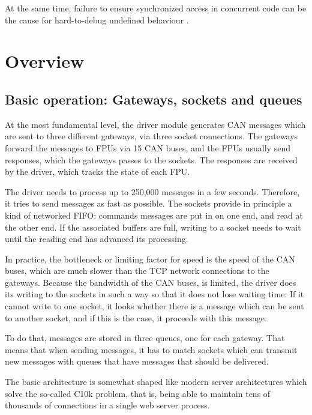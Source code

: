 \documentclass[fontsize=12,a4paper]{scrartcl}
\begin{document}
At the same time, failure to ensure synchronized access in concurrent
code can be the cause for hard-to-debug undefined behaviour
\cite{Regehr:AGtUBPt3}\cite{MeyersAlexandrescu:2004:DCL}\cite[p
  218-225]{Love:2013:LSP}.

\section{Overview}

\subsection{Basic operation: Gateways, sockets and queues}

At the most fundamental level, the driver module generates CAN
messages which are sent to three different gateways, via three socket
connections\cite[chapters 56-61]{Kerrisk:TLPI}. The gateways forward
the messages to FPUs via 15 CAN buses, and the FPUs usually send
responses, which the gateways passes to the sockets. The responses are
received by the driver, which tracks the state of each FPU.

The driver needs to process up to 250,000 messages in a few seconds.
Therefore, it tries to send messages as fast as possible. The sockets
provide in principle a kind of networked FIFO: commands messages are
put in on one end, and read at the other end. If the associated
buffers are full, writing to a socket needs to wait until the reading
end has advanced its processing.

In practice, the bottleneck or limiting factor for speed is the speed
of the CAN buses, which are much slower than the TCP network
connections to the gateways. Because the bandwidth of the CAN buses,
is limited, the driver does its writing to the sockets in such a way
so that it does not lose waiting time: If it cannot write to one
socket, it looks whether there is a message which can be sent to
another socket, and if this is the case, it proceeds with this
message.

To do that, messages are stored in three queues, one for each
gateway. That means that when sending messages, it has to match
sockets which can transmit new messages with queues that have messages
that should be delivered.

The basic architecture is somewhat shaped like modern server
architectures which solve the so-called C10k problem, that is, being
able to maintain tens of thousands of connections in a single web
server process\cite{Kegel:C10kProblem}\cite{WP:C10kProblem}.
\end{document}
